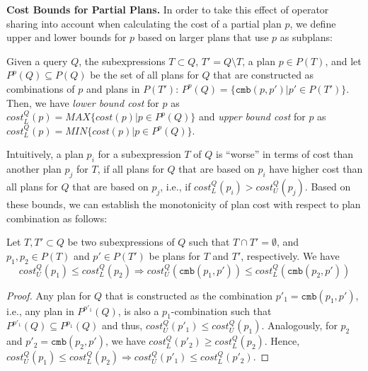 
\textbf{Cost Bounds for Partial Plans.} In order to take this effect
of operator sharing into account when calculating the cost of a
partial plan $p$, we define upper and lower bounds for $p$ based on
larger plans that use $p$ as subplans:

\begin{definition}
  \label{def:bounds}
  Given a query $Q$, the subexpressions $T \subset Q$, $T' = Q
  \setminus T$, a plan $p \in P(T)$, and let $P^p(Q) \subseteq P(Q)$
  be the set of all plans for $Q$ that are constructed as combinations
  of $p$ and plans in $P(T')$: $P^p(Q) = \{\mathtt{cmb}(p,p') | p' \in
  P(T')\}$.  Then, we have \emph{lower bound cost} for $p$ as
  $cost_L^Q(p)= MAX\{cost(p)| p \in P^p(Q)\}$ and \emph{upper bound
    cost} for $p$ as $cost_L^Q(p)= MIN\{cost(p)| p \in P^p(Q)\}$.
\end{definition}

Intuitively, a plan $p_i$ for a subexpression $T$ of $Q$ is ``worse''
in terms of cost than another plan $p_j$ for $T$, if all plans for $Q$
that are based on $p_i$ have higher cost than all plans for $Q$ that
are based on $p_j$, i.e., if $cost_L^Q(p_i) > cost_U^Q(p_j)$. Based on
these bounds, we can establish the monotonicity of plan cost with
respect to plan combination as follows:
  
\begin{lemma}
  Let $T,T' \subset Q$ be two subexpressions of $Q$ such that $T \cap
  T' = \emptyset$, and $p_1,p_2 \in P(T)$ and $p' \in P(T')$ be plans
  for $T$ and $T'$, respectively. We have
    \[ cost^Q_U(p_1) \leq cost^Q_L(p_2) \Rightarrow
    cost^Q_U(\mathtt{cmb}(p_1,p')) \leq
    cost^Q_L(\mathtt{cmb}(p_2,p')) \]
\end{lemma}
\begin{proof}
  Any plan for $Q$ that is
  constructed as the combination $p'_1 = \mathtt{cmb}(p_1,p')$, i.e.,
  any plan in $P^{p'_1}(Q)$, is also a $p_1$-combination %
such that $P^{p'_1}(Q) \subseteq P^{p_1}(Q)$ and thus, $cost^Q_U(p'_1) \leq
  cost^Q_U(p_1)$. Analogously, for $p_2$ and $p'_2 = \mathtt{cmb}(p_2,p')$, we have $cost^Q_L(p'_2) \geq cost^Q_L(p_2)$. Hence, $cost^Q_U(p_1) \leq cost^Q_L(p_2) \Rightarrow
  cost^Q_U(p'_1) \leq cost^Q_L(p'_2)$. 
\end{proof}

